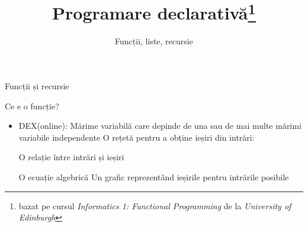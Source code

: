\documentclass[xcolor=pdftex,romanian,colorlinks]{beamer}
\title[PD---Baze]{Programare declarativă\thanks{bazat pe cursul \emph{Informatics 1: Functional Programming} de la \emph{University of Edinburgh}}}
\subtitle{Funcții, liste, recursie}
\begin{document}
\begin{frame}
  \titlepage
\end{frame}

\begin{section}{Funcții și recursie}
\begin{frame}{Ce e o funcție?}
\begin{itemize}
\item DEX(online): Mărime variabilă care depinde de una sau de mai multe mărimi variabile independente
\vitem O rețetă pentru a obține ieșiri din intrări: 
\hfill {}

\vitem O relație între intrări și ieșiri
      \hfill {} 
      
\vitem O ecuație algebrică \hfill {}
\vitem Un grafic reprezentând ieșirile pentru intrările posibile
 \pgfplotsset{height=5cm}
\end{itemize}
\end{frame}


\end{section}
\end{document}
